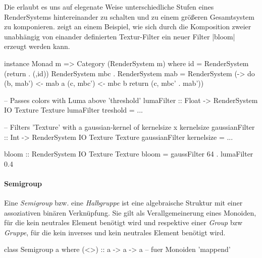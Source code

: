 Die erlaubt es uns auf elegenate Weise unterschiedliche Stufen eines RenderSystems hintereinander zu schalten und zu einem größeren Gesamtsystem zu komponieren.  zeigt an einem Beispiel, wie sich durch die Komposition zweier unabhängig von einander definierten Textur-Filter ein neuer Filter |bloom| erzeugt werden kann.

\begin{haskell}[label={lst:rendersystem-category},caption={Category Instanz für RenderSystem}]
instance Monad m => Category (RenderSystem m) where
  id = RenderSystem (return . (,id))
  RenderSystem mbc . RenderSystem mab = RenderSystem (\a -> do
    (b, mab') <- mab a
    (c, mbc') <- mbc b
    return (c, mbc' . mab'))
\end{haskell}

\begin{haskell}[label={lst:rendersystem-komposition-beispiel},caption={Beispiel einer Komposition von RenderSystem}]
-- Passes colors with Luma above 'threshold'
lumaFilter :: Float -> RenderSystem IO Texture Texture
lumaFilter treshold = ...

-- Filters 'Texture' with a gaussian-kernel of kernelsize x kernelsize
gaussianFilter :: Int -> RenderSystem IO Texture Texture
gaussianFilter kernelsize = ...

bloom :: RenderSystem IO Texture Texture
bloom = gaussFilter 64 . lumaFilter 0.4
\end{haskell}



\paragraph{Semigroup}

Eine \textit{Semigroup} bzw. eine \textit{Halbgruppe} ist eine algebraische Struktur mit einer assoziativen binären Verknüpfung. Sie gilt als Verallgemeinerung eines Monoiden, für die kein neutrales Element benötigt wird und respektive einer \textit{Group} bzw \textit{Gruppe}, für die kein inverses und kein neutrales Element benötigt wird.

\begin{haskell}[label={lst:class-semigroup},caption={Semigroup Klasse\protect\footnotemark},nolol]
class Semigroup a where
  (<>) :: a -> a -> a -- fuer Monoiden 'mappend'
\end{haskell}

